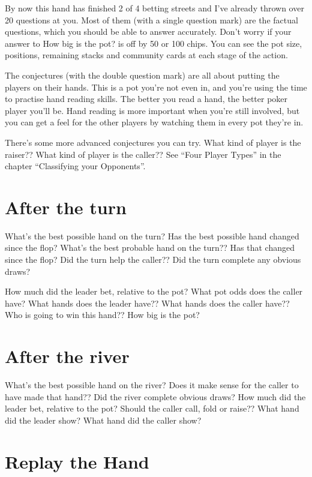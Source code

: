 By now this hand has finished 2 of 4 betting streets and I've already
thrown over 20 questions at you. Most of them (with a single
question mark) are the factual questions, which you
should be able to answer accurately. Don't worry if your answer to How
big is the pot? is off by 50 or 100 chips. You can see the pot size,
positions, remaining stacks and community cards at each stage of the
action.

The conjectures (with the double question mark)
are all about putting the players on their hands. This is
a pot you're not even in, and you're using the time to practise hand reading
skills. The better you read a hand, the better poker player you'll be.
Hand reading is more important when you're still involved, but you can get
a feel for the other players by watching them in every pot they're in.

There's some more advanced conjectures you can try. What kind of player
is the raiser?? What kind of player is the caller?? See ``Four Player Types''
in the chapter ``Classifying your Opponents''.

\section{After the turn}

What's the best possible hand on the turn? Has the best possible hand
changed since the flop? What's the best probable hand on the turn??
Has that changed since the flop? Did the turn help the caller?? Did
the turn complete any obvious draws?

How much did the leader bet, relative to the pot? What pot odds does
the caller have? What hands does the leader have?? What hands does the
caller have?? Who is going to win this hand?? How big is the pot?

\section{After the river}

What's the best possible hand on the river? Does it make sense for the
caller to have made that hand?? Did the river complete obvious draws?
How much did the leader bet, relative
to the pot? Should the caller call, fold or raise?? What hand did
the leader show? What hand did the caller show?

\section{Replay the Hand}


